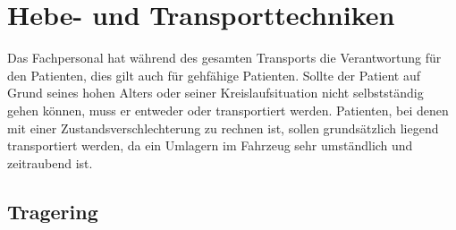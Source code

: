\nocite{KirschnickPflege2}





\needspace{0.5\textheight}
\section{Hebe- und Transporttechniken}


Das Fachpersonal hat während des gesamten Transports die
Verantwortung für den Patienten, dies gilt auch für gehfähige
Patienten. Sollte der Patient auf Grund seines hohen Alters
oder seiner Kreislaufsituation nicht selbstständig gehen
können, muss er entweder  oder 
transportiert werden. 
Patienten, bei denen mit einer Zustandsverschlechterung zu
rechnen ist, sollen grundsätzlich liegend
transportiert werden, da ein Umlagern im Fahrzeug sehr
umständlich und zeitraubend ist.










\subsection{Tragering}

